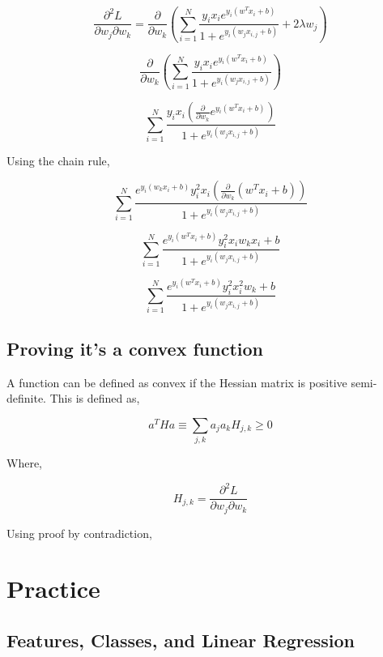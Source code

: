\documentclass[]{report}   %
\begin{document}
$$\frac{\partial^2 L}{\partial w_j\partial w_k}=\frac{\partial}{\partial w_k}(\sum_{i=1}^{N}\frac{y_ix_ie^{y_i(w^Tx_i+b)}}{1+e^{y_i(w_jx_{i,j}+b)}}+2\lambda w_j)$$

$$\frac{\partial}{\partial w_k}(\sum_{i=1}^{N}\frac{y_ix_ie^{y_i(w^Tx_i+b)}}{1+e^{y_i(w_jx_{i,j}+b)}})$$

$$\sum_{i=1}^{N}\frac{y_ix_i(\frac{\partial}{\partial w_k}e^{y_i(w^Tx_i+b)})}{1+e^{y_i(w_jx_{i,j}+b)}}$$

Using the chain rule,

$$\sum_{i=1}^{N}\frac{e^{y_i(w_kx_i+b)}y_i^2x_i(\frac{\partial}{\partial w_k}(w^Tx_i+b))}{1+e^{y_i(w_jx_{i,j}+b)}}$$

$$\sum_{i=1}^{N}\frac{e^{y_i(w^Tx_i+b)}y_i^2x_iw_kx_i+b}{1+e^{y_i(w_jx_{i,j}+b)}}$$

$$\sum_{i=1}^{N}\frac{e^{y_i(w^Tx_i+b)}y_i^2x_i^2w_k+b}{1+e^{y_i(w_jx_{i,j}+b)}}$$

\section{Proving it's a convex function}

A function can be defined as convex if the Hessian matrix is positive semi-definite. This is defined as,

$$a^THa\equiv\sum_{j,k}a_ja_kH_{j,k}\geq0$$

Where,

$$H_{j,k}=\frac{\partial^2L}{\partial w_j\partial w_k}$$

Using proof by contradiction, 




\chapter{Practice}


\section{Features, Classes, and Linear Regression}
\end{document}
